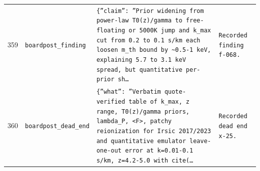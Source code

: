 \documentclass[11pt,a4paper]{article}
\begin{document}
\begin{longtable}{@{}p{}p{}p{}p{}@{}}
359 & \texttt{board}\newline\texttt{post\_\allowbreak{}finding} & \texttt{\{''claim'':\allowbreak{} ''Prior widening from power-law T0(z)\allowbreak{}/\allowbreak{}gamma to free-floating or 5000K jump and k\_\allowbreak{}max cut from 0.2 to 0.1 s/\allowbreak{}km each loosen m\_\allowbreak{}th bound by \textasciitilde{}\allowbreak{}0.5-1 keV,\allowbreak{} explaining 5.7 to 3.1 keV spread,\allowbreak{} but quantitative per-prior sh\ldots{}\allowbreak{}} & \texttt{Recorded finding f-068.} \\
360 & \texttt{board}\newline\texttt{post\_\allowbreak{}dead\_\allowbreak{}end} & \texttt{\{''what'':\allowbreak{} ''Verbatim quote-verified table of k\_\allowbreak{}max,\allowbreak{} z range,\allowbreak{} T0(z)\allowbreak{}/\allowbreak{}gamma priors,\allowbreak{} lambda\_\allowbreak{}P,\allowbreak{} \textless{}\allowbreak{}F\textgreater{}\allowbreak{},\allowbreak{} patchy reionization for Irsic 2017/\allowbreak{}2023 and quantitative emulator leave-one-out error at k=\allowbreak{}0.01-0.1 s/\allowbreak{}km,\allowbreak{} z=\allowbreak{}4.2-5.0 with cite(\ldots{}\allowbreak{}} & \texttt{Recorded dead end x-25.} \\
\bottomrule\end{longtable}
\end{document}
